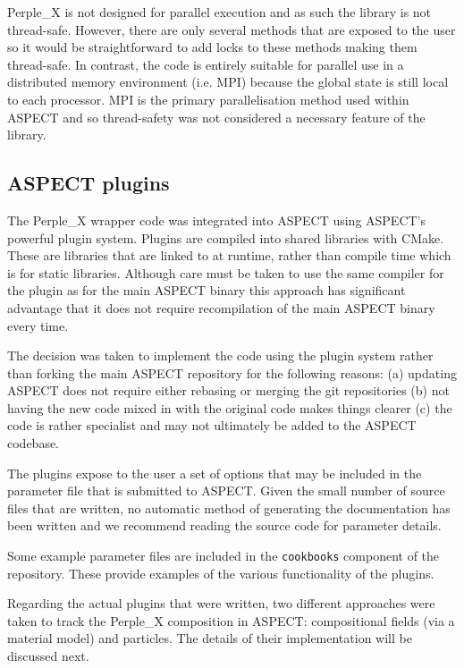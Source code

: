 Perple\_X is not designed for parallel execution and as such the library is not thread-safe. 
However, there are only several methods that are exposed to the user so it would be straightforward to add locks to these methods making them thread-safe.
In contrast, the code is entirely suitable for parallel use in a distributed memory environment (i.e. MPI) because the global state is still local to each processor.
MPI is the primary parallelisation method used within ASPECT and so thread-safety was not considered a necessary feature of the library.

\subsection{ASPECT plugins}

The Perple\_X wrapper code was integrated into ASPECT using ASPECT's powerful plugin system.
Plugins are compiled into shared libraries with CMake.
These are libraries that are linked to at runtime, rather than compile time which is for static libraries.
Although care must be taken to use the same compiler for the plugin as for the main ASPECT binary this approach has significant advantage that it does not require recompilation of the main ASPECT binary every time.

The decision was taken to implement the code using the plugin system rather than forking the main ASPECT repository for the following reasons: 
(a) updating ASPECT does not require either rebasing or merging the git repositories 
(b) not having the new code mixed in with the original code makes things clearer 
(c) the code is rather specialist and may not ultimately be added to the ASPECT codebase.

The plugins expose to the user a set of options that may be included in the parameter file that is submitted to ASPECT.
Given the small number of source files that are written, no automatic method of generating the documentation has been written and we recommend reading the source code for parameter details.

Some example parameter files are included in the \texttt{cookbooks} component of the repository.
These provide examples of the various functionality of the plugins.

Regarding the actual plugins that were written, two different approaches were taken to track the Perple\_X composition in ASPECT: compositional fields (via a material model) and particles.
The details of their implementation will be discussed next.


